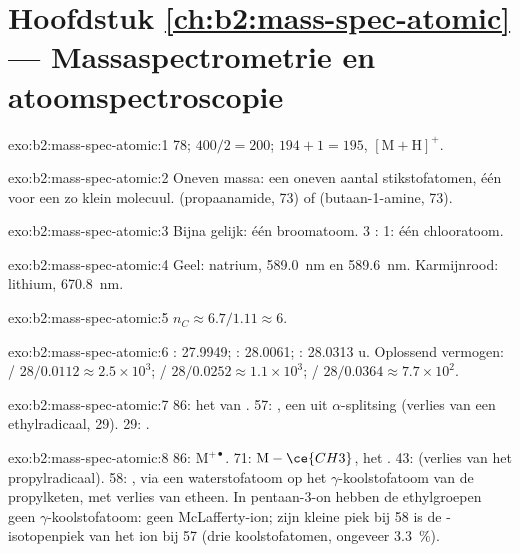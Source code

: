 \section*{Hoofdstuk \ref{ch:b2:mass-spec-atomic} --- Massaspectrometrie en atoomspectroscopie}

\begin{solution}{exo:b2:mass-spec-atomic:1}
78; $400/2 = 200$; $194 + 1 = 195$, $[\mathrm M + \mathrm H]^+$.
\end{solution}

\begin{solution}{exo:b2:mass-spec-atomic:2}
Oneven massa: een oneven aantal stikstofatomen, één voor een zo klein molecuul.  (propaanamide, 73)
of  (butaan-1-amine, 73).
\end{solution}

\begin{solution}{exo:b2:mass-spec-atomic:3}
Bijna gelijk: één broomatoom. 3 : 1: één chlooratoom.
\end{solution}

\begin{solution}{exo:b2:mass-spec-atomic:4}
Geel: natrium, \qty{589.0}{nm} en \qty{589.6}{nm}. Karmijnrood: lithium, \qty{670.8}{nm}.
\end{solution}

\begin{solution}{exo:b2:mass-spec-atomic:5}
$n_C \approx 6.7/1.11 \approx 6$.
\end{solution}

\begin{solution}{exo:b2:mass-spec-atomic:6}
: 27.9949; : 28.0061; : 28.0313 u. Oplossend vermogen: / $28/0.0112
\approx 2.5 \times 10^3$; / $28/0.0252 \approx 1.1 \times 10^3$; /
$28/0.0364 \approx 7.7 \times 10^2$.
\end{solution}

\begin{solution}{exo:b2:mass-spec-atomic:7}
86: het  van . 57: , een  uit $\alpha$-splitsing (verlies van
een ethylradicaal, 29). 29: .
\end{solution}

\begin{solution}{exo:b2:mass-spec-atomic:8}
86: $\mathrm M^{+\bullet}$. 71: $\mathrm M - \ce{CH3}$, het  . 43: 
(verlies van het propylradicaal). 58: , via een waterstofatoom op het
$\gamma$-koolstofatoom van de propylketen, met verlies van etheen. In pentaan-3-on hebben de ethylgroepen geen $\gamma$-koolstofatoom: geen
McLafferty-ion; zijn kleine piek bij 58 is de -isotopenpiek van het ion bij 57 (drie koolstofatomen,
ongeveer 3.3~\%).
\end{solution}

